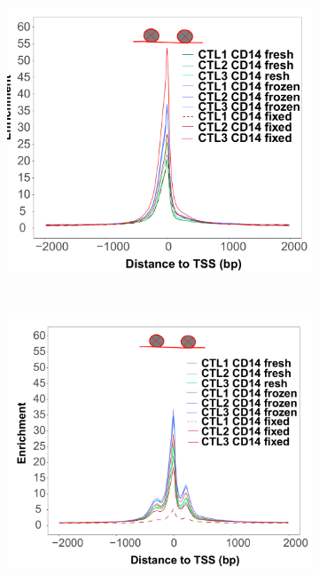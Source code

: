 \begin{figure}[H]
\centering
\begin{subfigure}[b]{0.45\textwidth}
\centering 
\includegraphics[width=\textwidth]{./Results1/pdfs/Core_ATAC_CD14_fresh_frozen_fixed_internucleosome_TSS}
\caption{}
\end{subfigure}
~
\begin{subfigure}[b]{0.45\textwidth}
\centering 
\includegraphics[width=\textwidth]{./Results1/pdfs/Core_ATAC_CD14_fresh_frozen_fixed_dinucleosome_TSS}
\caption{}

\end{subfigure}
\end{figure}

